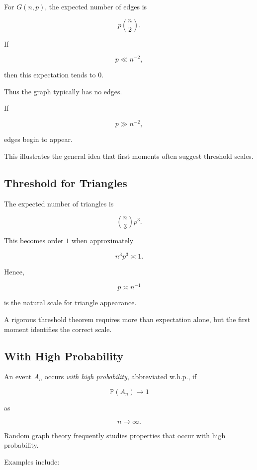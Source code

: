 For \(G(n,p)\), the expected number of edges is

\[
p\binom n2.
\]

If

\[
p\ll n^{-2},
\]

then this expectation tends to \(0\).

Thus the graph typically has no edges.

If

\[
p\gg n^{-2},
\]

edges begin to appear.

This illustrates the general idea that first moments often suggest
threshold scales.

\subsection{Threshold for Triangles}
\label{subsec:threshold-triangles-preview}

The expected number of triangles is

\[
\binom n3p^3.
\]

This becomes order \(1\) when approximately

\[
n^3p^3
\asymp
1.
\]

Hence,

\[
\boxed{
p\asymp n^{-1}
}
\]

is the natural scale for triangle appearance.

A rigorous threshold theorem requires more than expectation alone, but
the first moment identifies the correct scale.

\subsection{With High Probability}
\label{subsec:with-high-probability}

An event \(A_n\) occurs \emph{with high probability}, abbreviated
w.h.p., if

\[
\boxed{
\mathbb{P}(A_n)\to1
}
\]

as

\[
n\to\infty.
\]

Random graph theory frequently studies properties that occur with high
probability.

Examples include:

